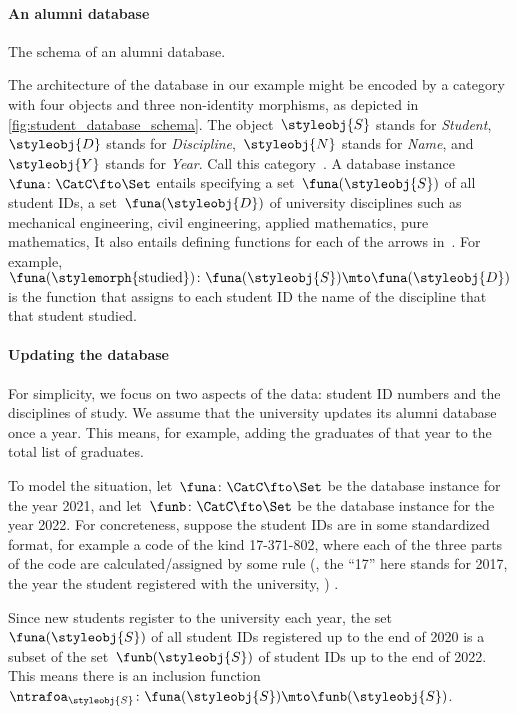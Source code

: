 \paragraph{An alumni database}

%
\begin{marginfigure}
    \centering
    \caption{The schema of an alumni database.}
    \label{fig:student_database_schema}
\end{marginfigure}
%

The architecture of the database in our example might be encoded by a category with four objects and three non-identity morphisms, as depicted in \cref{fig:student_database_schema}.
The object~$\styleobj{S}$ stands for \emph{Student},~$\styleobj{D}$ stands for \emph{Discipline},~$\styleobj{N}$ stands for \emph{Name}, and~$\styleobj{Y}$ stands for \emph{Year}.
Call this category~\CatC.
A database instance~$\funa \colon \CatC \fto \Set$ entails specifying a set~$\funa(\styleobj{S})$ of all student IDs, a set~$\funa(\styleobj{D})$ of university disciplines such as mechanical engineering, civil engineering, applied mathematics, pure mathematics, \etc
It also entails defining functions for each of the arrows in~\CatC.
For example,~$\funa(\stylemorph{\text{studied}}) \colon \funa(\styleobj{S}) \mto \funa(\styleobj{D})$ is the function that assigns to each student ID the name of the discipline that that student studied.

\paragraph{Updating the database}

For simplicity, we focus on two aspects of the data: student ID numbers and the disciplines of study.
We assume that the university updates its alumni database once a year.
This means, for example, adding the graduates of that year to the total list of graduates.

To model the situation, let~$\funa \colon \CatC \fto \Set$ be the database instance for the year 2021, and let~$\funb \colon \CatC \fto \Set$ be the database instance for the year 2022.
For concreteness, suppose the student IDs are in some standardized format, for example a code of the kind 17-371-802, where each of the three parts of the code are calculated/assigned by some rule (, the ``17'' here stands for 2017, the year the student registered with the university, \etc)
.

Since new students register to the university each year, the set~$\funa(\styleobj{S})$ of all student IDs registered up to the end of 2020 is a subset of the set~$\funb(\styleobj{S})$ of student IDs up to the end of 2022.
This means there is an inclusion function~$\ntrafoa_{\styleobj{S}} \colon \funa(\styleobj{S}) \mto \funb(\styleobj{S})$.

